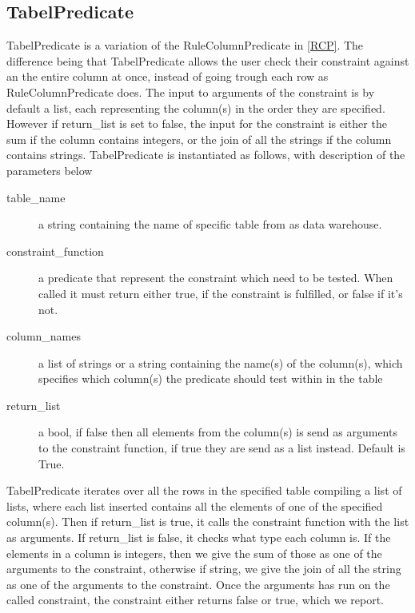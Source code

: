 \subsection{TabelPredicate}
TabelPredicate is a variation of the RuleColumnPredicate in \cref{RCP}. The difference being that TabelPredicate allows the user check their constraint against an the entire column at once, instead of going trough each row as RuleColumnPredicate does. The input to arguments of the constraint is by default a list, each representing the column(s) in the order they are specified. However if return\_list is set to false, the input for the constraint is either the sum if the column contains integers, or the join of all the strings if the column contains strings. TabelPredicate is instantiated as follows, with description of the parameters below


\begin{description}
\item [table\_name] a string containing the name of specific table from as data warehouse. 
\item [constraint\_function] a predicate that represent the constraint which need to be tested. When called it must return either true, if the constraint is fulfilled, or false if it's not.
\item [column\_names] a list of strings or a string containing the name(s) of the column(s), which specifies which column(s) the predicate should test within in the table
\item [return\_list] a bool, if false then all elements from the column(s) is send as arguments to the constraint function, if true they are send as a list instead. Default is True.
\end{description}

TabelPredicate iterates over all the rows in the specified table compiling a list of lists, where each list inserted contains all the elements of one of the specified column(s). Then if return\_list is true, it calls the constraint function with the list as arguments. If return\_list is false, it checks what type each column is. If the elements in a column is integers, then we give the sum of those as one of the arguments to the constraint, otherwise if string, we give the join of all the string as one of the arguments to the constraint. Once the arguments has run on the called constraint, the constraint either returns false or true, which we report.

